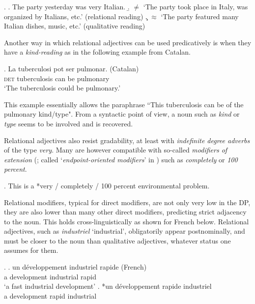 \ex. \label{italian party} \a. The party yesterday was very Italian.
\b. $\neq$ `The party took place in Italy, was organized by Italians, etc.’ (relational reading)
\c. $\approx$ `The party featured many Italian dishes, music, etc.’ (qualitative reading)

Another way in which relational adjectives can be used predicatively is when they have a \textit{kind-reading} \citep{mcnally:2004:relational} as in the following example from Catalan.

\exg. La tuberculosi pot ser pulmonar. (Catalan)\\
\textsc{det} tuberculosis can be pulmonary\\
`The tuberculosis could be pulmonary.’ \\ \null \hfill \citep[189]{mcnally:2004:relational}

This example essentially allows the paraphrase ``This tuberculosis can be of the pulmonary kind/type". From a syntactic point of view, a noun such as \textit{kind} or \textit{type} seems to be involved and is recovered.

Relational adjectives also resist gradability, at least with \textit{indefinite degree adverbs} \citep{fabregas:2014:adjectival} of the type \textit{very}. Many are however compatible with so-called \textit{modifiers of extension} (\citealt{fabregas:2014:adjectival}; called `\textit{endpoint-oriented modifiers}' in \citealt{kennedy:2005:scale}) such as \textit{completely} or \textit{100 percent}.

\ex. This is a *very / completely / 100 percent environmental problem.

Relational modifiers, typical for direct modifiers, are not only very low in the DP, they are also lower than many other direct modifiers, predicting strict adjacency to the noun. This holds cross-linguistically as shown for French below. Relational adjectives, such as \textit{industriel} `industrial’, obligatorily appear postnominally, and must be closer to the noun than qualitative adjectives, whatever status one assumes for them. 

\ex. \ag. un développement industriel rapide (French)\\
a development industrial rapid\\
`a fast industrial development’
\bg. *un développement rapide industriel\\
a development rapid industrial \null \hfill \citep[61]{bortolotto:2016:RA}\\

